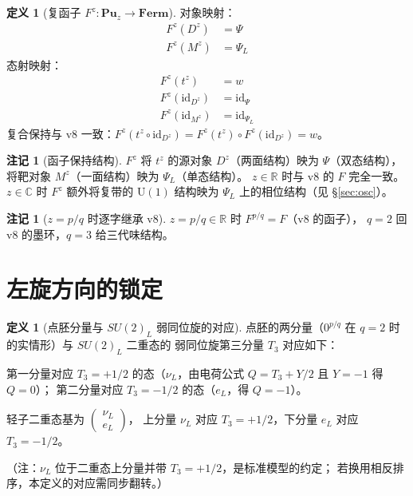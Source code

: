 \documentclass[11pt]{ctexart}
\theoremstyle{plain}
\theoremstyle{definition}
\newtheorem{defn}[thm]{定义}
\newtheorem{rem}[thm]{注记}
\newcommand{\Cat}{\mathbf}
\begin{document}
\begin{defn}[复函子 $F^z: \Cat{Pu}_z \to \Cat{Ferm}$]\label{def:functor}
对象映射：
\begin{align*}
F^z(D^z) &= \Psi \\
F^z(M^z) &= \Psi_L
\end{align*}
态射映射：
\begin{align*}
F^z(t^z) &= w \\
F^z(\mathrm{id}_{D^z}) &= \mathrm{id}_\Psi \\
F^z(\mathrm{id}_{M^z}) &= \mathrm{id}_{\Psi_L}
\end{align*}
复合保持与 v8 一致：$F^z(t^z\circ\mathrm{id}_{D^z}) =
F^z(t^z)\circ F^z(\mathrm{id}_{D^z}) = w$。
\end{defn}

\begin{rem}[函子保持结构]\label{rem:preserve}
$F^z$ 将 $t^z$ 的源对象 $D^z$（两面结构）映为 $\Psi$（双态结构），
将靶对象 $M^z$（一面结构）映为 $\Psi_L$（单态结构）。
$z\in\mathbb{R}$ 时与 v8 的 $F$ 完全一致。
$z\in\mathbb{C}$ 时 $F^z$ 额外将复带的 $\mathrm{U}(1)$ 结构映为
$\Psi_L$ 上的相位结构（见 \S\ref{sec:osc}）。
\end{rem}

\begin{rem}[$z=p/q$ 时逐字继承 v8]\label{rem:inherit}
$z = p/q\in\mathbb{R}$ 时 $F^{p/q} = F$（v8 的函子），
$q=2$ 回 v8 的墨环，$q=3$ 给三代味结构。
\end{rem}

\section{左旋方向的锁定}

\begin{defn}[点胚分量与 $SU(2)_L$ 弱同位旋的对应]\label{def:su2}
点胚的两分量（$0^{p/q}$ 在 $q=2$ 时的实情形）与 $SU(2)_L$ 二重态的
弱同位旋第三分量 $T_3$ 对应如下：

第一分量对应 $T_3 = +1/2$ 的态（$\nu_L$，由电荷公式 $Q = T_3 + Y/2$
且 $Y=-1$ 得 $Q=0$）；
第二分量对应 $T_3 = -1/2$ 的态（$e_L$，得 $Q=-1$）。

轻子二重态基为 $\begin{pmatrix}\nu_L\\ e_L\end{pmatrix}$，
上分量 $\nu_L$ 对应 $T_3=+1/2$，下分量 $e_L$ 对应 $T_3=-1/2$。

（注：$\nu_L$ 位于二重态上分量并带 $T_3=+1/2$，是标准模型的约定；
若换用相反排序，本定义的对应需同步翻转。）
\end{defn}
\end{document}
